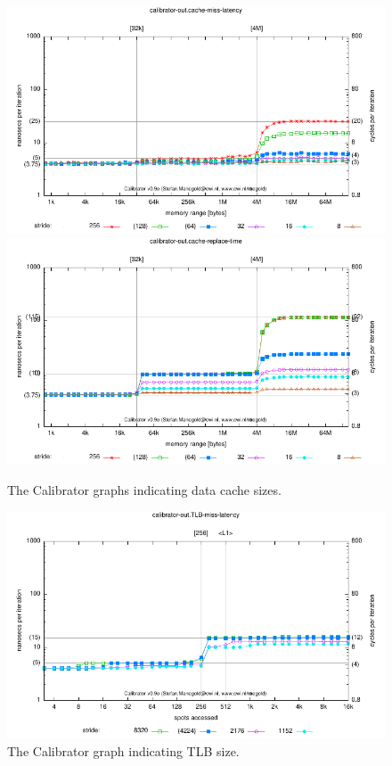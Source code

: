 \documentclass[11 pt]{article}
\begin{document}
\begin{figure}[htbp]
  \centering
	\includegraphics[type=pdf,ext=.pdf,read=.pdf,width=\columnwidth]{../system_info/calibrator-out.cache-miss-latency}
	\includegraphics[type=pdf,ext=.pdf,read=.pdf,width=\columnwidth]{../system_info/calibrator-out.cache-replace-time}
  \caption{The Calibrator graphs indicating data cache sizes.}
  \label{fig:calibrator_cache}
\end{figure}

\begin{figure}[htbp]
  \centering
	\includegraphics[type=pdf,ext=.pdf,read=.pdf,width=\columnwidth]{../system_info/calibrator-out.TLB-miss-latency}
  \caption{The Calibrator graph indicating TLB size.}
  \label{fig:calibrator_tlb}
\end{figure}
\end{document}
